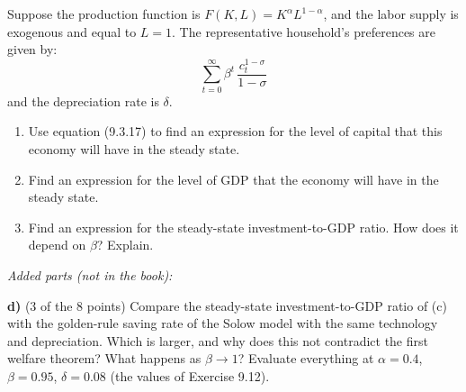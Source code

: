 \noindent Suppose the production function is $F(K,L)=K^{\alpha}L^{1-\alpha}$, and the labor supply is exogenous and equal to $L=1$. The
representative household's preferences are given by:
\[
\sum_{t=0}^{\infty}\beta^t\,\frac{c_t^{1-\sigma}}{1-\sigma}
\]
and the depreciation rate is $\delta$.
\begin{enumerate}[label=(\alph*),leftmargin=2.2em,topsep=2pt,itemsep=1pt]
\item Use equation (9.3.17) to find an expression for the level of capital that this economy will have in the steady state.
\item Find an expression for the level of GDP that the economy will have in the steady state.
\item Find an expression for the steady-state investment-to-GDP ratio. How does it depend on $\beta$? Explain.
\end{enumerate}
\noindent\textit{Added parts (not in the book):}\par\nopagebreak
\textbf{d)} (3 of the 8 points) Compare the steady-state investment-to-GDP ratio of (c) with the golden-rule saving rate of the Solow
model with the same technology and depreciation. Which is larger, and why does this not contradict the first welfare theorem?
What happens as $\beta\to1$? Evaluate everything at $\alpha=0.4$, $\beta=0.95$, $\delta=0.08$ (the values of Exercise 9.12).
\resolespaco
